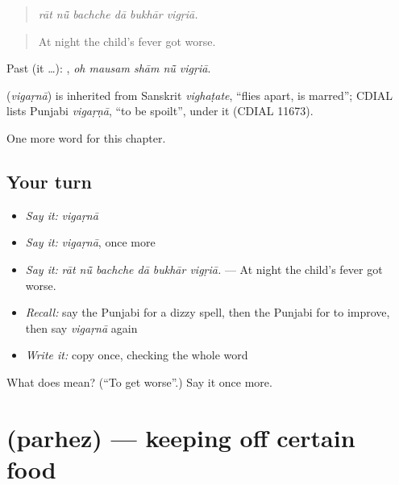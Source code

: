 \begin{quote}
     
\end{quote}

\begin{quote}
\emph{rāt nū̃ bachche dā bukhār vigṛiā.}
\end{quote}

\begin{quote}
At night the child's fever got worse.
\end{quote}

Past (it …):     , \emph{oh mausam shām nū̃ vigṛiā}.

\begin{cousinweb}
\textbf{} (\emph{vigaṛnā}) is inherited from Sanskrit \emph{vighaṭate}, \textquotedblleft{}flies apart, is marred\textquotedblright{}; CDIAL lists Punjabi \emph{vigaṛṇā}, \textquotedblleft{}to be spoilt\textquotedblright{}, under it (CDIAL 11673).
\end{cousinweb}

\begin{grammarlens}[title={What you've built}]
One more word for this chapter.
\end{grammarlens}

\subsection*{Your turn}
\begin{itemize}
\raggedright
  \item \emph{Say it:} \emph{vigaṛnā}
  \item \emph{Say it:} \emph{vigaṛnā}, once more
  \item \emph{Say it:} \emph{rāt nū̃ bachche dā bukhār vigṛiā.} — At night the child's fever got worse.
  \item \emph{Recall:} say the Punjabi for a dizzy spell, then the Punjabi for to improve, then say \emph{vigaṛnā} again
  \item \emph{Write it:} copy \textbf{} once, checking the whole word
\end{itemize}

\begin{tcolorbox}[breakable,colback=teal!4,colframe=teal!35!black,title={Before you move on}]
What does  mean? (\textquotedblleft{}To get worse\textquotedblright{}.) Say it once more.
\end{tcolorbox}
\section[\texorpdfstring{\pa{ਪਰਹੇਜ਼} (parhez)}{ਪਰਹੇਜ਼ (parhez)}]{ (parhez) — keeping off certain food}

